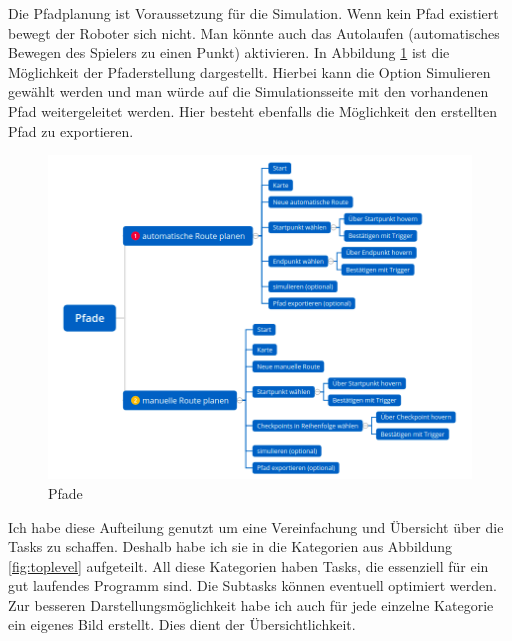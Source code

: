\documentclass{TUBAFarbeiten}
\begin{document}
Die Pfadplanung ist Voraussetzung für die Simulation. Wenn kein Pfad existiert bewegt der Roboter sich nicht. Man könnte auch das Autolaufen (automatisches Bewegen des Spielers zu einen Punkt) aktivieren. In Abbildung \ref{fig:Pfad} ist die Möglichkeit der Pfaderstellung dargestellt. Hierbei kann die Option Simulieren gewählt werden und man würde auf die Simulationsseite mit den vorhandenen Pfad weitergeleitet werden. Hier besteht ebenfalls die Möglichkeit den erstellten Pfad zu exportieren.\\

\begin{figure}
	\centering
	\includegraphics[width=\linewidth]{pfad.png}
	\caption{Pfade}
	\label{fig:Pfad}
\end{figure}

Ich habe diese Aufteilung genutzt um eine Vereinfachung und Übersicht über die Tasks zu schaffen. Deshalb habe ich sie in die Kategorien aus Abbildung \ref{fig:toplevel} aufgeteilt. All diese Kategorien haben Tasks, die essenziell für ein gut laufendes Programm sind. Die Subtasks können eventuell optimiert werden. Zur besseren Darstellungsmöglichkeit habe ich auch für jede einzelne Kategorie ein eigenes Bild erstellt. Dies dient der Übersichtlichkeit.
\newpage
\end{document}
